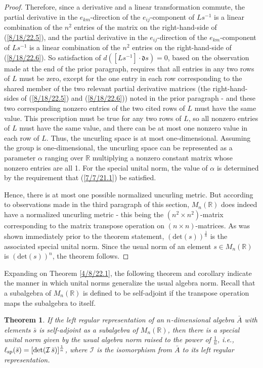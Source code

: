 \documentclass{amsart}
\numberwithin{equation}{section}
\newtheorem{theorem}{Theorem}
\theoremstyle{definition}
\numberwithin{theorem}{section}
\begin{document}
\begin{proof}
Therefore, since a derivative and a linear transformation commute, the partial derivative in the $e_{km}$-direction of the $e_{ij}$-component of $Ls^{-1}$ is a linear combination of the $n^2$ entries of the matrix on the right-hand-side of (\ref{8/18/22.5}), and  the partial derivative in the $e_{ij}$-direction of the $e_{km}$-component of $Ls^{-1}$ is a linear combination of the $n^2$ entries on the right-hand-side of (\ref{8/18/22.6}).
So satisfaction of \mbox{$d\left([Ls^{-1}]\cdot \mathfrak{d}s\right) = 0$,} based on the observation made at the end of the prior paragraph, requires that all entries in any two rows of $L$ must be zero, except for the one entry in each row corresponding to the shared member of the two relevant partial derivative matrices (the right-hand-sides of (\ref{8/18/22.5}) and (\ref{8/18/22.6})) noted in the prior paragraph - and these two corresponding nonzero entries of the two cited rows of $L$ must have the same value.  This prescription must be true for any two rows of $L$, so all nonzero entries of $L$ must have the same value, and there can be at most one nonzero value in each row of $L$.  Thus, the uncurling space is at most one-dimensional. Assuming the group is one-dimensional, the uncurling space can be represented as a parameter $\alpha$ ranging over $\mathbb{R}$ multiplying a nonzero constant matrix whose nonzero entries are all 1.  
For the special unital norm, the value of $\alpha$ is determined by the requirement that (\ref{7/7/21.1}) be satisfied. 


Hence, there is at most one possible normalized uncurling metric.  But according to observations made in the third paragraph of this section, $ M_n(\mathbb{R})$ does indeed have a normalized uncurling metric - this being the $(n^2\times n^2)$-matrix corresponding to the matrix transpose operation on $(n\times n)$-matrices.  As was shown immediately prior to the theorem statement, $(\mbox{det}(s))^{\frac{1}{n}}$ is the associated special unital norm.  Since the usual norm of an element $s\in M_n(\mathbb{R})$ is $(\mbox{det}(s))^n$, the theorem follows.
 \end{proof}
 
 Expanding on Theorem \ref{4/8/22.1}, the following theorem and corollary indicate the manner in which unital norms generalize the usual algebra norm.  Recall that a subalgebra of $M_n(\mathbb{R})$ is defined to be self-adjoint if the transpose operation maps the subalgebra to itself.
 
  \begin{theorem}\label{5/13/22.1} If the left regular representation of an $n$-dimensional algebra $\bar{A}$ with elements $\bar{s}$ is self-adjoint as a subalgebra of $M_n(\mathbb{R})$, then there is a special unital norm given by the usual algebra norm raised to the power of $\frac{1}{n}$, i.e., $\ell_{\rm sp}(\bar{s}) = [{\rm det}(\mathcal{I}\, \bar{s})]^\frac{1}{n}$, where $\mathcal{I}$ is the isomorphism from $\bar{A}$ to its left regular representation.
\end{theorem}
\end{document}
